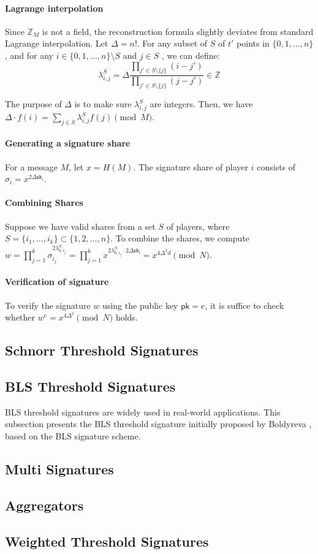 \paragraph{Lagrange interpolation} Since $\mathbb{Z}_M$ is not a field, the reconstruction formula slightly deviates from standard Lagrange interpolation. Let $\Delta=n!$. For any subset of $S$ of $t'$ points in $\{0,1,\dots, n\}$, and for any $i\in\{0,1,\dots, n\}\setminus S$ and $j\in S$ , we can define: 
\begin{equation*}
    \lambda_{i,j}^S = \Delta \frac{\prod_{j'\in S\setminus\{j\}} (i-j')}{\prod_{j'\in S\setminus \{j\}} (j-j')}\in \mathbb{Z}
\end{equation*} 

The purpose of $\Delta$ is to make sure $\lambda_{i, j}^S$ are integers. Then, we have $\Delta\cdot f(i) = \sum_{j\in S} \lambda_{i,j}^S f(j)\pmod{M}$. 

\paragraph{Generating a signature share} For a message $M$, let $x=H(M)$. The signature share of player $i$ consists of $\sigma_i = x^{2 \Delta \mathsf{sk_i}}$. 

\paragraph{Combining Shares} Suppose we have valid shares from a set $S$ of players, where $S=\{i_1, \dots, i_k\}\subset \{1, 2, \dots, n\}$. To combine the shares, we compute $w=\prod_{j=1}^k \sigma_{i_j}^{2\lambda_{0, i_j}^S} = \prod_{j=1}^k x^{2\lambda_{0, i_j}^S \cdot 2\Delta \mathsf{sk_i}} =x^{4\Delta^2 d}\pmod {N}$. 

\paragraph{Verification of signature} To verify the signature $w$ using the public key $\mathsf{pk}=e$, it is suffice to check whether $w^e=x^{4\Delta^2}\pmod{N}$ holds. 


\subsection{Schnorr Threshold Signatures}

\subsection{BLS Threshold Signatures}
BLS threshold signatures are widely used in real-world applications. This subsection presents the BLS threshold signature initially proposed by Boldyreva \cite{DBLP:conf/pkc/Boldyreva03}, based on the BLS signature scheme. 

\subsection{Multi Signatures}

\subsection{Aggregators}

\subsection{Weighted Threshold Signatures}